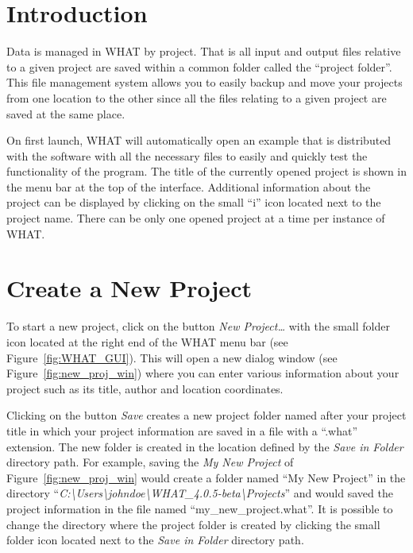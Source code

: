 \documentclass[WHATMANUAL.tex]{subfiles}
\begin{document}
\section{Introduction}

Data is managed in WHAT by project. That is all input and output files relative to a given project are saved within a common folder called the ``project folder''. This file management system allows you to easily backup and move your projects from one location to the other since all the files relating to a given project are saved at the same place. 

On first launch, WHAT will automatically open an example that is distributed with the software with all the necessary files to easily and quickly test the functionality of the program. The title of the currently opened project is shown in the menu bar at the top of the interface. Additional information about the project can be displayed by clicking on the small ``i'' icon located next to the project name. There can be only one opened project at a time per instance of WHAT. 

\section{Create a New Project}

To start a new project, click on the button \textsl{New Project\dots} with the small folder icon located at the right end of the WHAT menu bar (see Figure~\ref{fig:WHAT_GUI}). This will open a new dialog window (see Figure~\ref{fig:new_proj_win}) where you can enter various information about your project such as its title, author and location coordinates. 

Clicking on the button \textsl{Save} creates a new project folder named after your project title in which your project information are saved in a file with a ``.what'' extension. The new folder is created in the location defined by the \textsl{Save in Folder} directory path. For example, saving the \textsl{My New Project} of Figure~\ref{fig:new_proj_win} would create a folder named ``My New Project'' in the directory ``\textsl{C:\textbackslash{}Users\textbackslash{}johndoe\textbackslash{}WHAT\_4.0.5-beta\textbackslash{}Projects}'' and would saved the project information in the file named ``my\_new\_project.what''. It is possible to change the directory where the project folder is created by clicking the small folder icon located next to the \textsl{Save in Folder} directory path.
\end{document}
